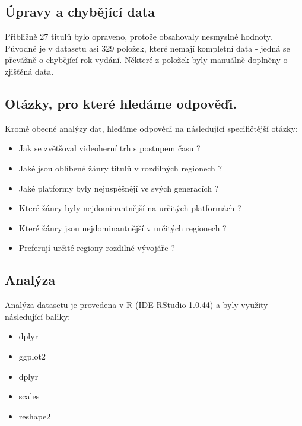 \documentclass[a4paper,11pt]{article}
\begin{document}
\subsection{Úpravy a chybějící data}
Přibližně 27 titulů bylo opraveno, protože obsahovaly nesmyslné hodnoty. Původně je v datasetu asi 329 položek, které nemají kompletní data - jedná se převážně o chybějící rok vydání. Některé z položek byly manuálně doplněny o zjišťěná data.

\subsection{Otázky, pro které hledáme odpověďi.}

Kromě obecné analýzy dat, hledáme odpovědi na následující specifičtější otázky:

\begin{itemize}
\item Jak se zvětšoval videoherní trh s postupem času ?

\item Jaké jsou oblíbené žánry titulů v rozdilných regionech ?

\item Jaké platformy byly nejuspěšnějí ve svých generacích ?

\item Které žánry byly nejdominantnější na určitých platformách ?

\item Které žánry jsou nejdominantnější v určitých regionech ?

\item Preferují určité regiony rozdilné vývojáře ?
\end{itemize}

\subsection{Analýza}
Analýza datasetu je provedena v R (IDE RStudio 1.0.44) a byly využity následující baliky:

\begin{itemize}
\item dplyr

\item ggplot2

\item dplyr

\item scales

\item reshape2
\end{itemize}
\end{document}
